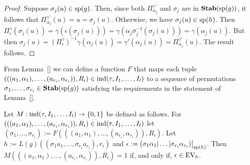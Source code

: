 \documentclass[../main/thesis.tex]{subfiles}
\begin{document}
\begin{proof}
  Suppose $\sigma_j (u) \in \text{sp}(g)$. Then, since both
  $\Pi^{\gamma'}_{\alpha_j}$ and $\sigma_j$ are in $\text{\textbf{Stab}} (\text{sp} (g))$, it follows that
  $\Pi^{\gamma'}_{\alpha_j}(u) = u = \sigma_j(u)$. Otherwise, we have $\sigma_j
  (u) \in \text{sp}(h)$. Then $\Pi^{\gamma}_{\epsilon} (\sigma_j (u)) = \gamma
  (\epsilon (\sigma_j(u))) = \gamma(\alpha_j \bar{\sigma}^{-1}_j (\sigma_j (u)))
  = \gamma(\alpha_j (u))$. But then $\sigma_j (u) =
  (\Pi^{\gamma}_{\epsilon})^{-1} \gamma (\alpha_j(u)) = \gamma' (\alpha_j(u)) =
  \Pi^{\gamma'}_{\alpha_j} (u)$. The result follows.
\end{proof}

From Lemma~\ref{} we can define a function $F$ that maps each tuple $(((a_1,
\alpha_1), \ldots, (a_{r_i}, \alpha_{r_i})), R_i) \in \text{\upshape ind} (\tau, I_1, \ldots ,
I_l)$ to a sequence of permutations $\sigma_1, \ldots, \sigma_{r_i} \in
\text{\textbf{Stab}} (\text{sp} (g))$ satisfying the requirements in the statement of Lemma~\ref{}.

Let $M : \text{\upshape ind} (\tau, I_1, \ldots , I_l) \rightarrow \{0,1\}$ be defined as follows. For
$(((a_1, \alpha_1), \ldots, (a_{r_i}, \alpha_{r_i})), R_i) \in \text{\upshape ind} (\tau, I_1,
\ldots , I_l)$ let $(\sigma_1, \ldots, \sigma_{r_i}) := F(((a_1, \alpha_1),
\ldots, (a_{r_i}, \alpha_{r_i})), R_i)$. Let $h := L(g)((\sigma_1 a_1, \ldots,
\sigma_{r_i} a_{r_i}), r_i)$ and $\epsilon := \restr{(\sigma_1 \alpha_1 \vert
  \ldots \vert \sigma_{r_i} \alpha_{r_i})}{\consp(h)}$. Then $M(((a_1,
\alpha_1), \ldots, (a_{r_i}, \alpha_{r_i})), R_i) = 1$ if, and only if,
$\epsilon \in \text{EV}_h$.
\end{document}

